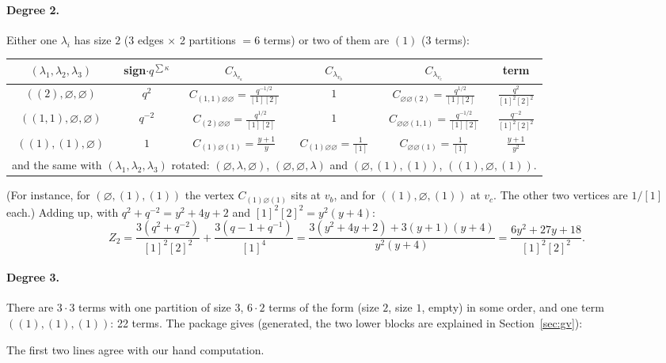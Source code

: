 \documentclass[11pt]{article}
\theoremstyle{plain}
\theoremstyle{definition}
\theoremstyle{remark}
\newcommand{\es}{\varnothing}
\begin{document}
\paragraph{Degree 2.} Either one $\lambda_i$ has size $2$ (3 edges $\times$ 2 partitions $=6$
terms) or two of them are $(1)$ (3 terms):
\begin{center}
\renewcommand{\arraystretch}{1.5}
\begin{tabular}{cccccc}
\toprule
$(\lambda_1,\lambda_2,\lambda_3)$ & sign$\cdot q^{\sum\kappa}$ & $C_{\lambda_{v_a}}$ & $C_{\lambda_{v_b}}$ & $C_{\lambda_{v_c}}$ & term\\
\midrule
$((2),\es,\es)$ & $q^2$ & $C_{(1,1)\es\es}=\frac{q^{-1/2}}{[1][2]}$ & $1$ & $C_{\es\es(2)}=\frac{q^{1/2}}{[1][2]}$ & $\frac{q^2}{[1]^2[2]^2}$\\
$((1,1),\es,\es)$ & $q^{-2}$ & $C_{(2)\es\es}=\frac{q^{1/2}}{[1][2]}$ & $1$ & $C_{\es\es(1,1)}=\frac{q^{-1/2}}{[1][2]}$ & $\frac{q^{-2}}{[1]^2[2]^2}$\\
$((1),(1),\es)$ & $1$ & $C_{(1)\es(1)}=\frac{y+1}{y}$ & $C_{(1)\es\es}=\frac1{[1]}$ & $C_{\es\es(1)}=\frac1{[1]}$ & $\frac{y+1}{y^2}$\\
\midrule
\multicolumn{6}{l}{and the same with $(\lambda_1,\lambda_2,\lambda_3)$ rotated: $(\es,\lambda,\es)$,
$(\es,\es,\lambda)$ and $(\es,(1),(1))$, $((1),\es,(1))$.}\\
\bottomrule
\end{tabular}
\end{center}
(For instance, for $(\es,(1),(1))$ the vertex $C_{(1)\es(1)}$ sits at $v_b$, and for
$((1),\es,(1))$ at $v_c$. The other two vertices are $1/[1]$ each.) Adding up, with
$q^2+q^{-2}=y^2+4y+2$ and $[1]^2[2]^2=y^2(y+4)$:
\begin{equation}\label{eq:Z2P2}
Z_2=\frac{3(q^2+q^{-2})}{[1]^2[2]^2}+\frac{3(q-1+q^{-1})}{[1]^4}
=\frac{3(y^2+4y+2)+3(y+1)(y+4)}{y^2(y+4)}=\frac{6y^2+27y+18}{[1]^2[2]^2}.
\end{equation}

\paragraph{Degree 3.} There are $3\cdot3$ terms with one partition of size $3$, $6\cdot2$ terms
of the form (size $2$, size $1$, empty) in some order, and one term $((1),(1),(1))$: 22 terms.
The package gives (generated, the two lower blocks are explained in Section~\ref{sec:gv}):

The first two lines agree with our hand computation.
\end{document}
